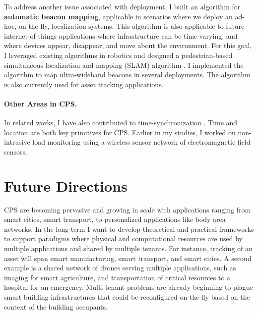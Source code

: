 \documentclass[10pt]{article}
\begin{document}
To address another issue associated with deployment, I built an algorithm for {\bf automatic beacon mapping}, applicable in scenarios where we deploy an ad-hoc, on-the-fly, localization systems. This algorithm is also applicable to future internet-of-things applications where infrastructure can be time-varying, and where devices appear, disappear, and move about the environment. %
For this goal, I leveraged existing algorithms in robotics and designed a pedestrian-based simultaneous localization and mapping (SLAM) algorithm \cite{mobileAR}. I implemented the algorithm to map ultra-wideband beacons in several deployments. The algorithm is also currently used for asset tracking applications.


\paragraph{Other Areas in CPS. }
In related works, I have also contributed to time-synchronization \cite{buevich2013hardware, dongare2017pulsar}. Time and location are both key primitives for CPS. 
Earlier in my studies, I worked on non-intrusive load monitoring \cite{rajagopal2013magnetic, rajagopal2013demo} using a wireless sensor network of electromagnetic field sensors. 

\section{Future Directions}

CPS are becoming pervasive and growing in scale with applications ranging from smart cities, smart transport, 
to personalized applications like body area networks.  %
In the long-term I want to develop theoretical and practical frameworks to support 
paradigms where physical and computational resources are used by multiple applications and shared by multiple tenants.  For instance, tracking of an asset will span smart manufacturing, smart transport, and smart cities.  A second example is a shared network of drones serving multiple applications, such as imaging for smart agriculture, and transportation of critical resources to a hospital for an emergency. Multi-tenant problems are already beginning to plague smart building infrastructures that could %
be reconfigured on-the-fly based on the context of the building occupants. %
\end{document}
